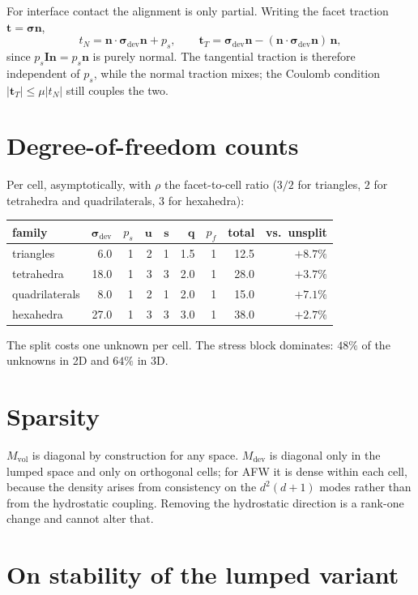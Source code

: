 \documentclass[11pt,a4paper]{article}
\newcommand{\dev}{\mathrm{dev}}
\newcommand{\bsig}{\boldsymbol{\sigma}}
\newcommand{\bu}{\boldsymbol{u}}
\newcommand{\bq}{\boldsymbol{q}}
\newcommand{\bn}{\boldsymbol{n}}
\newcommand{\bI}{\boldsymbol{I}}
\theoremstyle{plain}
\theoremstyle{remark}
\begin{document}
For interface contact the alignment is only partial. Writing the facet
traction $\boldsymbol{t}=\bsig\bn$,
\begin{equation}
  t_N = \bn\cdot\bsig_{\dev}\bn + p_s ,
  \qquad
  \boldsymbol{t}_T = \bsig_{\dev}\bn - (\bn\cdot\bsig_{\dev}\bn)\,\bn ,
\end{equation}
since $p_s\bI\bn = p_s\bn$ is purely normal. The tangential traction is
therefore independent of $p_s$, while the normal traction mixes; the Coulomb
condition $|\boldsymbol{t}_T|\le\mu|t_N|$ still couples the two.

\section{Degree-of-freedom counts}

Per cell, asymptotically, with $\rho$ the facet-to-cell ratio ($3/2$ for
triangles, $2$ for tetrahedra and quadrilaterals, $3$ for hexahedra):
\begin{center}
\begin{tabular}{lrrrrrrrr}
\toprule
family & $\bsig_{\dev}$ & $p_s$ & $\bu$ & $\boldsymbol{s}$ & $\bq$ & $p_f$
       & total & vs.\ unsplit \\
\midrule
triangles    &  6.0 & 1 & 2 & 1 & 1.5 & 1 & 12.5 & $+8.7\%$ \\
tetrahedra   & 18.0 & 1 & 3 & 3 & 2.0 & 1 & 28.0 & $+3.7\%$ \\
quadrilaterals & 8.0 & 1 & 2 & 1 & 2.0 & 1 & 15.0 & $+7.1\%$ \\
hexahedra    & 27.0 & 1 & 3 & 3 & 3.0 & 1 & 38.0 & $+2.7\%$ \\
\bottomrule
\end{tabular}
\end{center}
The split costs one unknown per cell. The stress block dominates: $48\%$ of the
unknowns in 2D and $64\%$ in 3D.

\section{Sparsity}

$M_{\mathrm{vol}}$ is diagonal by construction for any space. $M_{\dev}$ is
diagonal only in the lumped space and only on orthogonal cells; for AFW it is
dense within each cell, because the density arises from consistency on the
$d^{2}(d+1)$ modes rather than from the hydrostatic coupling. Removing the
hydrostatic direction is a rank-one change and cannot alter that.

\section{On stability of the lumped variant}
\label{sec:infsup}
\end{document}
